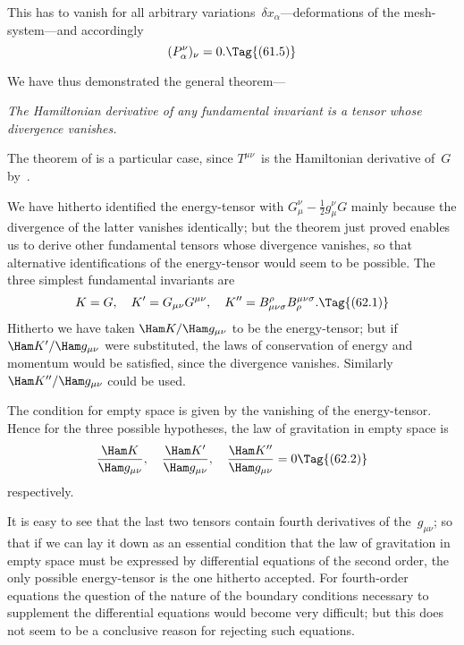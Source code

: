 \documentclass[12pt]{book}
\begin{document}
This has to vanish for all arbitrary variations~$\delta x_{\alpha}$---deformations of the mesh-system---and
accordingly
\[
(P_{\alpha}^{\nu})_{\nu} = 0.
\Tag{(61.5)}
\]

We have thus demonstrated the general theorem---

\emph{The Hamiltonian derivative of any fundamental invariant is a tensor whose
%
divergence vanishes.}
%

The theorem of  is a particular case, since $T^{\mu\nu}$~is the Hamiltonian
derivative of~$G$ by~.

%
%

We have hitherto identified the energy-tensor with $G_{\mu}^{\nu} - \tfrac{1}{2} g_{\mu}^{\nu}G$ mainly
because the divergence of the latter vanishes identically; but the theorem
just proved enables us to derive other fundamental tensors whose divergence
vanishes, so that alternative identifications of the energy-tensor would seem
to be possible. The three simplest fundamental invariants are
\[
K = G,\quad
K' = G_{\mu\nu} G^{\mu\nu},\quad
K'' = B_{\mu\nu\sigma}^{\rho} B_{\rho}^{\mu\nu\sigma}.
\Tag{(62.1)}
\]
Hitherto we have taken $\Ham K/\Ham g_{\mu\nu}$ to be the energy-tensor; but if $\Ham K'/\Ham g_{\mu\nu}$
were substituted, the laws of conservation of energy and momentum would be
satisfied, since the divergence vanishes. Similarly $\Ham K''/\Ham g_{\mu\nu}$ could be used.

The condition for empty space is given by the vanishing of the energy-tensor.
Hence for the three possible hypotheses, the law of gravitation in
empty space is
\[
\frac{\Ham K}{\Ham g_{\mu\nu}},\quad
\frac{\Ham K'}{\Ham g_{\mu\nu}},\quad
\frac{\Ham K''}{\Ham g_{\mu\nu}} = 0
\Tag{(62.2)}
\]
respectively.

It is easy to see that the last two tensors contain fourth derivatives of the~$g_{\mu\nu}$;
so that if we can lay it down as an essential condition that the law of
gravitation in empty space must be expressed by differential equations of the
second order, the only possible energy-tensor is the one hitherto accepted.
For fourth-order equations the question of the nature of the boundary conditions
necessary to supplement the differential equations would become very
difficult; but this does not seem to be a conclusive reason for rejecting such
equations.
\end{document}
